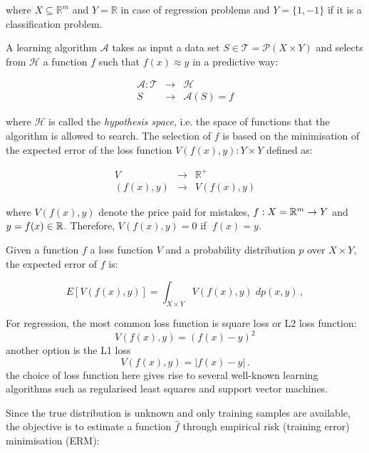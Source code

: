 \noindent where $X \subseteq \mathbb{R}^m$ and $Y = \mathbb{R}$ in case of
regression problems and $Y = \{1,-1\}$  if it is a classification problem. 


A learning algorithm $\mathcal{A}$ takes as input a data set $S \in
\mathscr{T}=\mathscr{P}(X\times Y)$ and selects from $\mathcal{H}$ a function
$f$ such that $f(x)\approx y $ in a predictive way:

\begin{eqnarray*}
\mathcal{A}: \mathscr{T} &\rightarrow & \mathcal{H} \\
S &\rightarrow &\mathcal{A}(S) = f
\end{eqnarray*}

\noindent where $\mathcal{H}$ is called the {\em hypothesis space}, i.e. the space
of functions that the algorithm is allowed to search. The selection of
$f$ is based on the minimisation of the expected error of the loss
function $V(f(x),y): Y \times Y$ defined as:

\begin{eqnarray*}
 V & \rightarrow & \mathbb{R}^+ \\
  (f(x), y) &\rightarrow & V(f(x),y)
\end{eqnarray*}

\noindent where $V(f(x),y)$ denote the price paid for mistakes, $f:X={\mathbb R }^m\to Y$ and
$y=f(x)\in{\mathbb R }$. Therefore, $V(f(x),y)=0$ if $\;f(x)=y$.

Given a function $f$ a loss function $V$ and a probability distribution $p$ over $X \times Y$, the expected error of $f$ is:

\begin{equation}
\label{eq:expetedrisk}
E[V(f(x),y)] = \int_{X\times Y} V(f(x),y)\;dp(x,y)\,,
\end{equation}


For regression, the most common loss function is square loss or L2 loss function:
\begin{equation}
\label{eq:l2loss}
V(f(x),y) = (f(x)-y)^2
\end{equation}
\noindent another option is the L1 loss
\begin{equation}
\label{eq:l1loss}
V(f(x),y) = |f(x)-y| \, .
\end{equation}
\noindent the choice of loss function here gives rise to several well-known
learning algorithms such as regularised least squares and support vector
machines. %

Since the true distribution is unknown and only training samples are available,
the objective is to estimate a function $\hat{f}$ through empirical risk
(training error) minimisation (ERM): 

